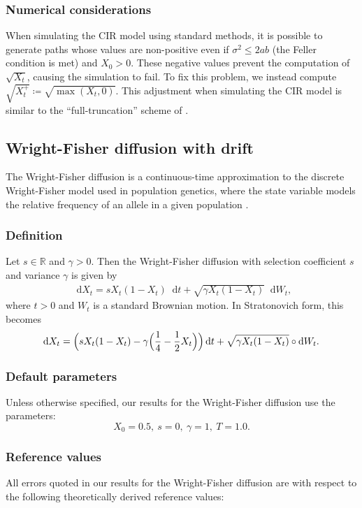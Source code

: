 \documentclass[11pt, letterpaper]{article}
\theoremstyle{definition}
\theoremstyle{remark}
\newcommand{\R}{\mathbb{R}}
\newcommand{\diff}{\mathop{}\!\mathrm{d}}
\begin{document}
\begin{appendices}
\subsubsection*{Numerical considerations}
When simulating the CIR model using standard methods, it is possible to generate paths whose values are non-positive even if $\sigma^2 \leq 2ab$ (the Feller condition \cite{feller1951diffusion} is met) and $X_0 > 0$.
These negative values prevent the computation of $\sqrt{X_t}$, causing the simulation to fail.
To fix this problem, we instead compute $\sqrt{X_t^+} \coloneqq \sqrt{\max{(X_t, 0)}}$.
This adjustment when simulating the CIR model is similar to the ``full-truncation'' scheme of \cite{lord2010truncation}.


\subsection{Wright-Fisher diffusion with drift}\label{app:wf}
The Wright-Fisher diffusion is a continuous-time approximation to the discrete Wright-Fisher model used in population genetics, where the state variable models the relative frequency of an allele in a given population \cite{ewens2004genetics, etheridge2011genetics, meser2016wrightfisher}.

\subsubsection*{Definition}
Let $s\in \R$ and $\gamma > 0$. Then the Wright-Fisher diffusion with selection coefficient $s$ and variance $\gamma$ is given by
\begin{align*}
\diff X_t = sX_t(1-X_t) \diff t + \sqrt{\gamma X_t(1-X_t)} \diff W_t,
\end{align*}
where $t > 0$ and $W_t$ is a standard Brownian motion.
In Stratonovich form, this becomes
\begin{align*}
\diff X_t = \Bigl(sX_t(1-X_t) - \gamma\Bigl(\frac{1}{4} - \frac{1}{2}X_t\Bigr)\Bigr) \diff t + \sqrt{\gamma X_t(1-X_t)} \circ \diff W_t.
\end{align*}
\subsubsection*{Default parameters}
Unless otherwise specified, our results for the Wright-Fisher diffusion use the parameters:
\[X_{0}=0.5,\ s=0,\ \gamma=1,\ T = 1.0.\]

\subsubsection*{Reference values}
All errors quoted in our results for the Wright-Fisher diffusion are with respect to the following theoretically derived reference values:


\end{appendices}
\end{document}
